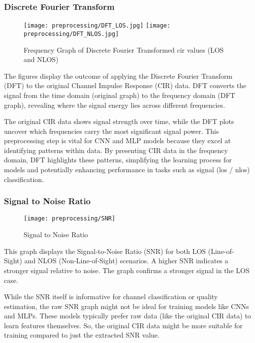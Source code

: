 \subsubsection{Discrete Fourier Transform}\label{dft_visual}

\begin{figure}[H] 
  \centering
  \texttt{[image: preprocessing/DFT\_LOS.jpg]}
  \texttt{[image: preprocessing/DFT\_NLOS.jpg]}
  \caption{Frequency Graph of Discrete Fourier Transformed \acrshort{cir} values (LOS and NLOS)}\label{fig:frequency_graph_dft}
\end{figure}

The figures display the outcome of applying the Discrete Fourier Transform (DFT) to the original Channel Impulse Response (CIR) data. DFT converts the signal from the time domain (original graph) to the frequency domain (DFT graph), revealing where the signal energy lies across different frequencies.

The original CIR data shows signal strength over time, while the DFT plots uncover which frequencies carry the most significant signal power. This preprocessing step is vital for CNN and MLP models because they excel at identifying patterns within data. By presenting CIR data in the frequency domain, DFT highlights these patterns, simplifying the learning process for models and potentially enhancing performance in tasks such as signal (\gls{los} / \gls{nlos}) classification.

\subsubsection{Signal to Noise Ratio}\label{snr_visual}

\begin{figure}[H]
	\centering
	\texttt{[image: preprocessing/SNR]} %
	\caption{Signal to Noise Ratio}\label{fig:snr}
\end{figure}

This graph displays the Signal-to-Noise Ratio (SNR) for both LOS (Line-of-Sight) and NLOS (Non-Line-of-Sight) scenarios.  A higher SNR indicates a stronger signal relative to noise. The graph confirms a stronger signal in the LOS case.

While the SNR itself is informative for channel classification or quality estimation, the raw SNR graph might not be ideal for training models like CNNs and MLPs. These models typically prefer raw data (like the original CIR data) to learn features themselves. So, the original CIR data might be more suitable for training compared to just the extracted SNR value.

